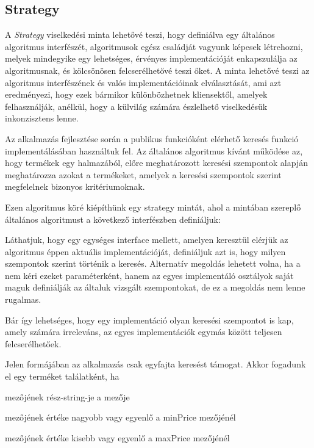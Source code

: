 \subsection{Strategy}

A \emph{Strategy} viselkedési minta lehetővé teszi, hogy definiálva egy általános algoritmus interfészét, algoritmusok egész családját vagyunk képesek létrehozni, melyek mindegyike egy lehetséges, érvényes implementációját enkapszulálja az algoritmusnak, és kölcsönösen felcserélhetővé teszi őket. A minta lehetővé teszi az algoritmus interfészének és valós implementációinak elválasztását, ami azt eredményezi, hogy ezek bármikor különbözhetnek kliensektől, amelyek felhasználják, anélkül, hogy a külvilág számára észlelhető viselkedésük inkonzisztens lenne. \par


Az alkalmazás fejlesztése során a publikus funkcióként elérhető keresés funkció implementálásában használtuk fel. Az általános algoritmus kívánt működése az, hogy termékek egy halmazából, előre meghatározott keresési szempontok alapján meghatározza azokat a termékeket, amelyek a keresési szempontok szerint megfelelnek bizonyos kritériumoknak. \par

Ezen algoritmus köré kiépíthünk egy strategy mintát, ahol a mintában szereplő általános algoritmust a következő interfészben definiáljuk: 


Láthatjuk, hogy egy egységes interface mellett, amelyen keresztül elérjük az algoritmus éppen aktuális implementációját, definiáljuk azt is, hogy milyen szempontok szerint történik a keresés. Alternatív megoldás lehetett volna, ha a  nem kéri ezeket paraméterként, hanem az egyes implementáló osztályok saját maguk definiálják az általuk vizsgált szempontokat, de ez a megoldás nem lenne rugalmas. \par

 Bár így lehetséges, hogy egy implementáció olyan keresési szempontot is kap, amely számára irreleváns, az egyes implementációk egymás között teljesen felcserélhetőek. \par
 
 Jelen formájában az alkalmazás csak egyfajta keresést támogat. Akkor fogadunk el egy terméket találatként, ha
 
 \begin{listing}
 	\item {} mezőjének rész-string-je a   mezője
 	\item {} mezőjének értéke nagyobb vagy egyenlő a  minPrice mezőjénél
 	\item {} mezőjének értéke kisebb vagy egyenlő a  maxPrice mezőjénél
 \end{listing}

